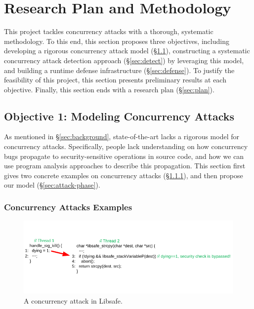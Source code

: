 \section{Research Plan and Methodology} \label{sec:rep}

This \xxx project tackles concurrency attacks with a thorough, systematic 
methodology. To this end, this section proposes three objectives, including 
developing a rigorous concurrency attack model (\S\ref{sec:model}), 
constructing a systematic concurrency attack detection approach 
(\S\ref{sec:detect}) by leveraging this model, and building a runtime defense 
infrastructure (\S\ref{sec:defense}). To justify the feasibility of this 
project, this section presents preliminary results at each objective. Finally, 
this section ends with a research plan (\S\ref{sec:plan}).

\subsection{Objective 1: Modeling Concurrency Attacks} \label{sec:model}

As mentioned in \S\ref{sec:background}, state-of-the-art lacks a rigorous model 
for concurrency attacks. Specifically, people lack understanding on how 
concurrency bugs propagate to security-sensitive operations in source code, and 
how we can use program analysis approaches to describe this propagation. This 
section first gives two concrete examples on concurrency attacks 
(\S\ref{sec:examples}), and then propose our model (\S\ref{sec:attack-phase}).

\subsubsection{Concurrency Attacks Examples} \label{sec:examples}

\begin{figure}[t]
\centering
\includegraphics[width=0.99\columnwidth]{figures/libsafe}
\vspace{-.05in}
\caption{{A concurrency attack in Libsafe.}} \label{fig:libsafe}
\vspace{-.05in}
\end{figure}

